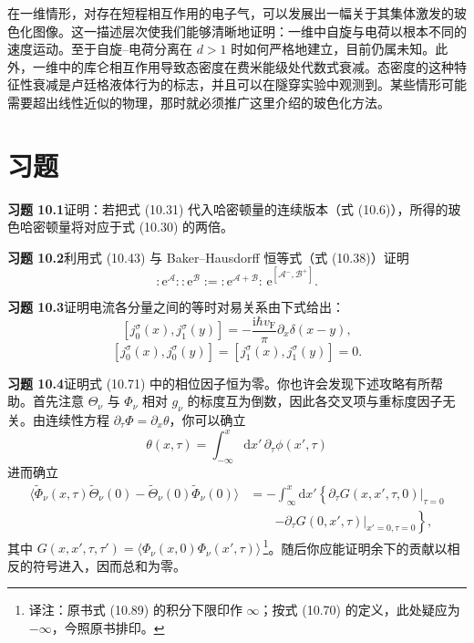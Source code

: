 在一维情形，对存在短程相互作用的电子气，可以发展出一幅关于其集体激发的玻色化图像。这一描述层次使我们能够清晰地证明：一维中自旋与电荷以根本不同的速度运动。至于自旋–电荷分离在 $d>1$ 时如何严格地建立，目前仍属未知。此外，一维中的库仑相互作用导致态密度在费米能级处代数式衰减。态密度的这种特征性衰减是卢廷格液体行为的标志，并且可以在隧穿实验中观测到。某些情形可能需要超出线性近似的物理，那时就必须推广这里介绍的玻色化方法。

\section*{习题}

\textbf{习题 10.1}\quad 证明：若把式 (10.31) 代入哈密顿量的连续版本（式 (10.6)），所得的玻色哈密顿量将对应于式 (10.30) 的两倍。

\textbf{习题 10.2}\quad 利用式 (10.43) 与 Baker–Hausdorff 恒等式（式 (10.38)）证明
\begin{equation*}
:\mathrm{e}^{\mathcal{A}}::\mathrm{e}^{\mathcal{B}}:=:\mathrm{e}^{\mathcal{A}+\mathcal{B}}:\,\mathrm{e}^{[\mathcal{A}^{-},\mathcal{B}^{+}]}.
\tag{10.85}
\end{equation*}

\textbf{习题 10.3}\quad 证明电流各分量之间的等时对易关系由下式给出：
\begin{equation*}
\left[j_{0}^{\sigma}(x),j_{1}^{\sigma}(y)\right]=-\frac{\mathrm{i}\hbar v_{\mathrm{F}}}{\pi}\partial_{x}\delta(x-y),
\tag{10.86}
\end{equation*}
\begin{equation*}
\left[j_{0}^{\sigma}(x),j_{0}^{\sigma}(y)\right]=\left[j_{1}^{\sigma}(x),j_{1}^{\sigma}(y)\right]=0.
\tag{10.87}
\end{equation*}

\textbf{习题 10.4}\quad 证明式 (10.71) 中的相位因子恒为零。你也许会发现下述攻略有所帮助。首先注意 $\Theta_{\nu}$ 与 $\Phi_{\nu}$ 相对 $g_{\nu}$ 的标度互为倒数，因此各交叉项与重标度因子无关。由连续性方程 $\partial_{\tau}\Phi=\partial_{x}\theta$，你可以确立
\begin{equation*}
\theta(x,\tau)=\int_{-\infty}^{x}\mathrm{d}x'\,\partial_{\tau}\phi(x',\tau)
\tag{10.88}
\end{equation*}
进而确立
\begin{align*}
\langle\tilde{\Phi}_{\nu}(x,\tau)\tilde{\Theta}_{\nu}(0)-\tilde{\Theta}_{\nu}(0)\tilde{\Phi}_{\nu}(0)\rangle&=-\int_{\infty}^{x}\mathrm{d}x'\left\{\partial_{\tau}G(x,x',\tau,0)|_{\tau=0}\right.\\
&\qquad\left.-\partial_{\tau}G(0,x',\tau)|_{x'=0,\tau=0}\right\},
\tag{10.89}
\end{align*}
其中 $G(x,x',\tau,\tau')=\langle\Phi_{\nu}(x,0)\Phi_{\nu}(x',\tau)\rangle$\,\footnote{译注：原书式 (10.89) 的积分下限印作 $\infty$；按式 (10.70) 的定义，此处疑应为 $-\infty$，今照原书排印。}。随后你应能证明余下的贡献以相反的符号进入，因而总和为零。

